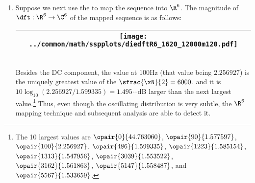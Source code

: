 \begin{example}
\begin{enumerate}
  \item \label{item:nonstat34_12000m120_R6}
    Suppose we next use the   to map
    the sequence into $\R^6$.
    The magnitude of $\dft:\R^6\to\C^6$ of the mapped sequence is as follows:
    \\\begin{tabular}{|>{\scs}c|}
         \hline
         \texttt{[image: ../common/math/sspplots/diedftR6\_1620\_12000m120.pdf]}%
       \\\hline
    \end{tabular}\\
     Besides the DC component, the value at 100Hz (that value being $2.256927$) 
     is the uniquely greatest value of the $\sfrac{\xN}{2}=6000$.
     and it is $10\log_{10}(2.256927/1.599335)=1.495\cdots$dB larger than the next largest value.\footnote{
     The 10 largest values are
       $\opair{   0}{44.763060}$, 
       $\opair{  90}{ 1.577597}$, 
       $\opair{ 100}{ 2.256927}$, 
       $\opair{ 486}{ 1.599335}$, 
       $\opair{1223}{ 1.585154}$, 
       $\opair{1313}{ 1.547956}$,
       $\opair{3039}{ 1.553522}$, 
       $\opair{3162}{ 1.561863}$,
       $\opair{5147}{ 1.558487}$, and
       $\opair{5567}{ 1.533659}$.
     }
     Thus, even though the oscillating distribution is very subtle, the $\R^6$ mapping technique
     and subsequent analysis are able to detect it.
\end{enumerate}
\end{example}

